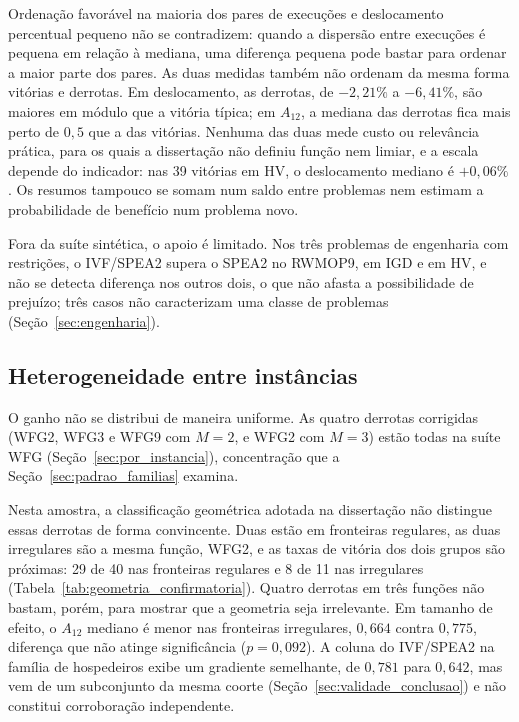 Ordenação favorável na maioria dos pares de execuções e deslocamento percentual pequeno não se contradizem: quando a dispersão entre execuções é pequena em relação à mediana, uma diferença pequena pode bastar para ordenar a maior parte dos pares. As duas medidas também não ordenam da mesma forma vitórias e derrotas. Em deslocamento, as derrotas, de $-2{,}21\%$ a $-6{,}41\%$, são maiores em módulo que a vitória típica; em $A_{12}$, a mediana das derrotas fica mais perto de $0{,}5$ que a das vitórias. Nenhuma das duas mede custo ou relevância prática, para os quais a dissertação não definiu função nem limiar, e a escala depende do indicador: nas 39 vitórias em HV, o deslocamento mediano é $+0{,}06\%$. Os resumos tampouco se somam num saldo entre problemas nem estimam a probabilidade de benefício num problema novo.

Fora da suíte sintética, o apoio é limitado. Nos três problemas de engenharia com restrições, o IVF/SPEA2 supera o SPEA2 no RWMOP9, em IGD e em HV, e não se detecta diferença nos outros dois, o que não afasta a possibilidade de prejuízo; três casos não caracterizam uma classe de problemas (Seção~\ref{sec:engenharia}).

\subsection{Heterogeneidade entre instâncias}

O ganho não se distribui de maneira uniforme. As quatro derrotas corrigidas (WFG2, WFG3 e WFG9 com $M = 2$, e WFG2 com $M = 3$) estão todas na suíte WFG (Seção~\ref{sec:por_instancia}), concentração que a Seção~\ref{sec:padrao_familias} examina.

Nesta amostra, a classificação geométrica adotada na dissertação não distingue essas derrotas de forma convincente. Duas estão em fronteiras regulares, as duas irregulares são a mesma função, WFG2, e as taxas de vitória dos dois grupos são próximas: 29 de 40 nas fronteiras regulares e 8 de 11 nas irregulares (Tabela~\ref{tab:geometria_confirmatoria}). Quatro derrotas em três funções não bastam, porém, para mostrar que a geometria seja irrelevante. Em tamanho de efeito, o $A_{12}$ mediano é menor nas fronteiras irregulares, $0{,}664$ contra $0{,}775$, diferença que não atinge significância ($p = 0{,}092$). A coluna do IVF/SPEA2 na família de hospedeiros exibe um gradiente semelhante, de $0{,}781$ para $0{,}642$, mas vem de um subconjunto da mesma coorte (Seção~\ref{sec:validade_conclusao}) e não constitui corroboração independente.

